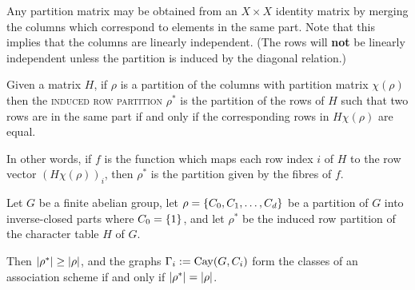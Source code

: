 \documentclass{report}
\begin{document}
    Any partition matrix may be obtained from an $X \times X$ identity matrix by
    merging the columns which correspond to elements in the same part.
    Note that this implies that the columns are linearly independent.
    (The rows will \textbf{not} be linearly independent unless the partition
    is induced by the diagonal relation.)

    \begin{defn}\label{defn:induced-row-partition}
      Given a matrix $H$, if $\rho$ is a partition of the columns with
      partition matrix $\chi(\rho)$ then the \textsc{induced row partition}
      $\rho^*$ is the partition of the rows of $H$ such that two rows are in the
      same part if and only if the corresponding rows in $H\chi(\rho)$ are
      equal.
    \end{defn}

    In other words, if $f$ is the function which maps each row index
    $i$ of $H$ to the row vector $(H\chi(\rho))_i$, then $\rho^*$ is the
    partition given by the fibres of $f$.
    \cite[Section 12.7]{godsil}

    \begin{thm}
      \label{thm:translation-char}
      Let $G$ be a finite abelian group,
      let $\rho = \left\lbrace C_0, C_1, \ldots, C_d \right\rbrace$ be a partition of $G$
      into inverse-closed parts where $C_0 = \left\lbrace 1 \right\rbrace$, and
      let $\rho^*$ be the induced row partition
      of the character table $H$ of $G$.

      Then $\left\lvert \rho^* \right\rvert \geq \left\lvert \rho \right\rvert$,
      and the graphs $\Gamma_i := \operatorname{Cay}(G, C_i)$ form the classes of an
      association scheme if and only if $\left\lvert \rho^* \right\rvert = \left\lvert \rho \right\rvert$.
    \end{thm}
\end{document}
